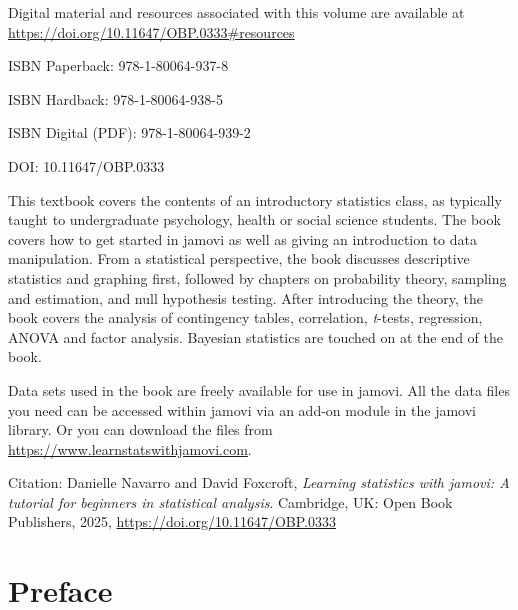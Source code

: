 \documentclass[
  a4paper,
]{book}
\renewcommand*\contentsname{Table of contents}
\newcommand\contentsname{Table of contents}
\begin{document}
Digital material and resources associated with this volume are available at \\ \url{https://doi.org/10.11647/OBP.0333\#resources}

ISBN Paperback: 978-1-80064-937-8

ISBN Hardback: 978-1-80064-938-5

ISBN Digital (PDF): 978-1-80064-939-2

DOI: 10.11647/OBP.0333


\vfill
\hspace{0pt}
\pagebreak

\hspace{0pt}
\vfill

This textbook covers the contents of an introductory statistics class, as typically taught to undergraduate psychology, health or social science students. The book covers how to get started in jamovi as well as giving an introduction to data manipulation. From a statistical perspective, the book discusses descriptive statistics and graphing first, followed by chapters on probability theory, sampling and estimation, and null hypothesis testing. After introducing the theory, the book covers the analysis of contingency tables, correlation, \textit{t}-tests, regression, ANOVA and factor analysis. Bayesian statistics are touched on at the end of the book.

Data sets used in the book are freely available for use in jamovi. All the data files you need can be accessed within jamovi via an add-on module in the jamovi library. Or you can download the files from \url{https://www.learnstatswithjamovi.com}.


Citation: Danielle Navarro and David Foxcroft, \textit{Learning statistics with jamovi: A tutorial for beginners in statistical analysis}. Cambridge, UK: Open Book Publishers, 2025, \url{https://doi.org/10.11647/OBP.0333}

\vfill
\hspace{0pt}

\ifdefined\Shaded\renewenvironment{Shaded}{\begin{tcolorbox}[breakable, enhanced, interior hidden, sharp corners, borderline west={3pt}{0pt}{shadecolor}, boxrule=0pt, frame hidden]}{\end{tcolorbox}}\fi

\renewcommand*\contentsname{Table of contents}
{
\hypersetup{linkcolor=}
\setcounter{tocdepth}{2}
\tableofcontents
}
\mainmatter
{}

\hypertarget{preface}{%
\chapter*{Preface}\label{preface}}
\end{document}
